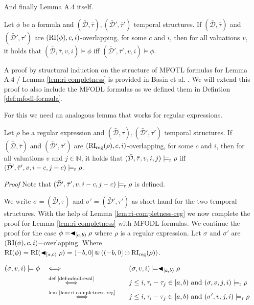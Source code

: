 And finally Lemma A.4 itself.
\begin{lemma}
    \label{lem:ri-completness}
    Let $\phi$ be a formula and $(\bar{\mathcal{D}}, \bar{\tau}), (\bar{\mathcal{D}}', \bar{\tau}')$ temporal structures.
    If $(\bar{\mathcal{D}}, \bar{\tau})$ and $(\bar{\mathcal{D}}', \bar{\tau}')$ are $(\operatorname{RI}(\phi),c,i)$-overlapping, for some $c$ and $i$, then for all valuations $v$, it holds that $(\bar{\mathcal{D}}, \bar{\tau},v,i) \models \phi$ iff $(\bar{\mathcal{D}}',\bar{\tau}',v,i) \models \phi$.
\end{lemma}

A proof by structural induction on the structure of MFOTL formulas for Lemma A.4 \cite{Basin2016} / Lemma \ref{lem:ri-completness} is provided in Basin et al. \cite{Basin2016}.
We will extend this proof to also include the MFODL formulas as we defined them in Defintion \ref{def:mfodl-formula}.

For this we need an analogous lemma that works for regular expressions.

\begin{lemma}
    \label{lem:ri-completness-reg}
    Let $\rho$ be a regular expression and $(\bar{\mathcal{D}}, \bar{\tau}), (\bar{\mathcal{D}}', \bar{\tau}')$ temporal structures.
    If $(\bar{\mathcal{D}}, \bar{\tau})$ and $(\bar{\mathcal{D}}', \bar{\tau}')$ are $(\operatorname{RI}_{\text{reg}}(\rho),c,i)$-overlapping, for some $c$ and $i$, then for all valuations $v$ and $j \in \mathbb{N}$, it holds that $(\bar{\mathcal{D}}, \bar{\tau},v,i,j) \models_{\text{r}} \rho$ iff $(\bar{\mathcal{D}}',\bar{\tau}',v,i-c,j-c) \models_{\text{r}} \rho$.
\end{lemma}

\textit{Proof} Note that $(\bar{\mathcal{D}}', \bar{\tau}', v, i-c, j-c) \models_{\text{r}} \rho$ is defined.

We write $\sigma = (\bar{\mathcal{D}}, \bar{\tau})$ and $\sigma' = (\bar{\mathcal{D}}', \bar{\tau}')$ as short hand for the two temporal structures.
With the help of Lemma \ref{lem:ri-completness-reg} we now complete the proof for Lemma \ref{lem:ri-completness} with MFODL formulas.
We continue the proof for the case $\phi = \blacktriangleleft_{[a,b)} \rho$ where $\rho$ is a regular expression.
Let $\sigma$ and $\sigma' $ are $ (\operatorname{RI}(\phi),c,i)-$overlapping.
Where $\operatorname{RI}(\phi) = \operatorname{RI}(\blacktriangleleft_{[a,b)} \rho) = (-b,0] \Cup ((-b,0] \oplus \operatorname{RI}_{\text{reg}}(\rho))$.

\begin{alignat*}{3}
    (\sigma, v, i) \models \phi \quad
    &\Longleftrightarrow \quad
        &&(\sigma, v, i) \models \blacktriangleleft_{[a,b)} \rho \\
    &\overset{\text{def \ref{def:mfodl-eval}}}{\Longleftrightarrow} \quad
        &&j \leq i, \tau_i - \tau_j \in [a,b) \text{ and } (\sigma, v, j, i) \models_{\text{r}} \rho \\
    &\overset{\text{lem \ref{lem:ri-completness-reg}}}{\Longleftrightarrow} \quad
        &&j \leq i, \tau_i - \tau_j \in [a,b) \text{ and } (\sigma', v, j, i) \models_{\text{r}} \rho \\
\end{alignat*}








